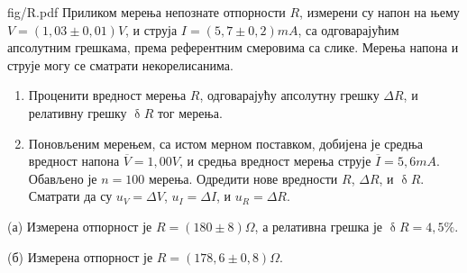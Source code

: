 \begin{slikaDesno}{fig/R.pdf}
\PID 
Приликом мерења непознате отпорности $R$, измерени су напон на њему 
$V = (1,03 \pm 0,01)\unit{V}$, и струја $I = (5,7 \pm 0,2)\unit{mA}$,
са одговарајућим апсолутним грешкама, 
према референтним смеровима са слике. Мерења напона и струје 
могу се сматрати некорелисанима.
\begin{enumerate}[label=(\alph*)]
\item Проценити вредност мерења 
$R$, одговарајућу апсолутну грешку $\Delta R$, и 
релативну грешку $\updelta R$ тог мерења. 
\item Поновљеним мерењем, са истом мерном поставком, добијена је средња 
вредност напона $\overline V = 1,00\unit{V}$, и средња вредност мерења 
струје $\overline I = 5,6\unit{mA}$. Обављено је $n = 100$ мерења. Одредити нове вредности 
$R$, $\Delta R$, и $\updelta R$. Сматрати да су $u_V = \Delta V$, $u_I = \Delta I$, и 
$u_R = \Delta R$.
\end{enumerate}
\end{slikaDesno}

\REZULTAT

(а) Измерена отпорност је $R = (180 \pm 8)\unit{\Omega}$, а релативна грешка је $\updelta R = 4,5\%$. 

(б) Измерена отпорност је $R = (178,6 \pm 0,8)\unit{\Omega}$.